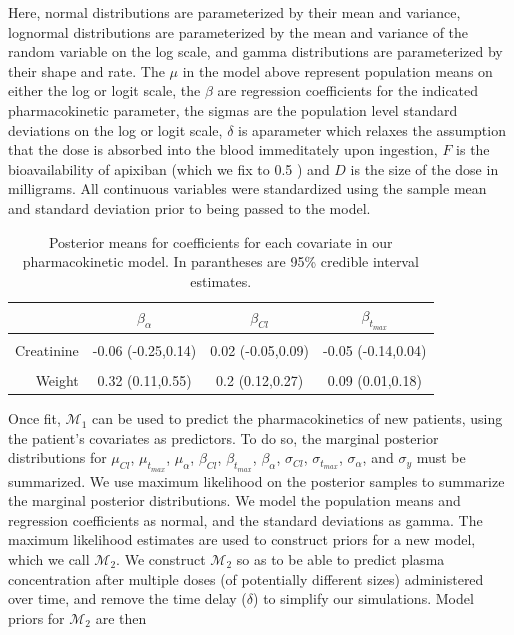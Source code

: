 Here, normal distributions are parameterized by their mean and variance, lognormal distributions are parameterized by the mean and variance of the random variable on the log scale, and gamma distributions are parameterized by their shape and rate.  The $\mu$ in the model above represent population means on either the log or logit scale, the $\beta$ are regression coefficients for the indicated pharmacokinetic parameter, the sigmas are the population level standard deviations on the log or logit scale, $\delta$ is aparameter which relaxes the assumption that the dose is absorbed into the blood immeditately upon ingestion, $F$ is the bioavailability of apixiban (which we fix to 0.5 \cite{byon2019apixaban}) and $D$ is the size of the dose in milligrams.  All continuous variables were standardized using the sample mean and standard deviation prior to being passed to the model. 



\begin{table}\label{tab:coefs}
	\centering
	\begin{tabular}[t]{rccc}
		\toprule
		& $\beta_\alpha$ & $\beta_{Cl}$ & $\beta_{t_{max}}$\\
		\midrule
		\cellcolor{gray!6}{Age} & \cellcolor{gray!6}{-0.08 (-0.27,0.1)} & \cellcolor{gray!6}{0.01 (-0.06,0.08)} & \cellcolor{gray!6}{-0.01 (-0.1,0.08)}\\
		Creatinine & -0.06 (-0.25,0.14) & 0.02 (-0.05,0.09) & -0.05 (-0.14,0.04)\\
		\cellcolor{gray!6}{Sex} & \cellcolor{gray!6}{-0.2 (-0.53,0.15)} & \cellcolor{gray!6}{0.39 (0.23,0.54)} & \cellcolor{gray!6}{-0.01 (-0.18,0.15)}\\
		Weight & 0.32 (0.11,0.55) & 0.2 (0.12,0.27) & 0.09 (0.01,0.18)\\
		\bottomrule
	\end{tabular}
	\caption{Posterior means for coefficients for each covariate in our pharmacokinetic model.  In parantheses are 95\% credible interval estimates.}
\end{table}


Once fit, $ \mathcal{M}_1$ can be used to predict the pharmacokinetics of new patients, using the patient’s covariates as predictors.  To do so, the marginal posterior distributions for $ \mu_{Cl} $, $ \mu_{t_{max}} $, $ \mu_{\alpha}$, $ \beta_{Cl} $, $ \beta_{t_{max}} $, $ \beta_{\alpha} $, $ \sigma_{Cl} $, $ \sigma_{t_{max}} $, $ \sigma_{\alpha} $, and $ \sigma_y $ must be summarized.  We use maximum likelihood on the posterior samples to summarize the marginal posterior distributions. We model the population means  and regression coefficients as normal, and the standard deviations  as gamma.  The maximum likelihood estimates are used to construct priors for a new model, which we call $ \mathcal{M}_2 $. We construct $ \mathcal{M}_2 $ so as to be able to predict plasma concentration after multiple doses (of potentially different sizes) administered over time, and remove the time delay ($ \delta $) to simplify our simulations.  Model priors for $ \mathcal{M}_2 $ are then 

